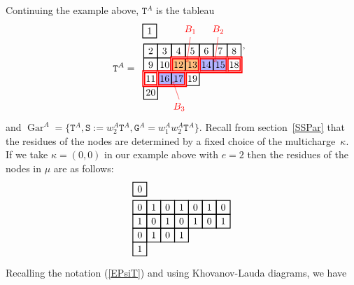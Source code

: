 \documentclass[twoside,11pt,reqno]{amsart}
\numberwithin{equation}{section}
\theoremstyle{definition}  %
\newcommand{\Stab}{\operatorname{Stab}}
\newcommand{\0}{{\bar 0}}
\newcommand{\1}{{\bar 1}}
\def\T{{\mathtt T}}
\def\Stab{{\mathtt S}}
\def\G{{\mathtt G}}
\def\Gar{{\operatorname{Gar}}}
\newcommand\Tableau[2][\relax]{
  \begin{tikzpicture}[scale=0.5,draw/.append style={thick,black}]
    \ifx\relax#1\relax%
    \else %
      \foreach\box in {#1} { \filldraw[blue!30]\box+(-.5,-.5)rectangle++(.5,.5); }
    \fi
    \newcount\row\newcount\col
    \row=0
    \foreach \Row in {#2} {
       \col=1
       \foreach\k in \Row {
          \draw(\the\col,\the\row)+(-.5,-.5)rectangle++(.5,.5);
          \draw(\the\col,\the\row)node{\k};
          \global\advance\col by 1
       }
       \global\advance\row by -1
    }
  \end{tikzpicture}
}
\begin{document}
Continuing the example above, $\T^A$ is the tableau
$$\T^A=\begin{array}{l}
\Tableau{{1}}\\[-20pt]
\begin{tikzpicture}[scale=0.5,draw/.append style={thick,black},baseline=1mm]
  \fill[orange!50](2.5,-1.5)rectangle(4.5,-0.5);
  \fill[blue!30](4.5,-1.5)rectangle(6.5,-0.5);
  \fill[blue!30](1.5,-2.5)rectangle(3.5,-1.5);
  \newcount\col
  \foreach\Row/\row in {{2,3,4,5,6,7,8}/0,{9,10,12,13,14,15,18}/-1,{11,16,17,19}/-2,{20}/-3} {
     \col=1
     \foreach\k in \Row {
        \draw(\the\col,\row)+(-.5,-.5)rectangle++(.5,.5);
        \draw(\the\col,\row)node{\k};
        \global\advance\col by 1
      }
   }
   \draw[red,double,very thick](2.5,-1.5)--(2.5,-0.5)--(7.5,-0.5)--(7.5,-1.5)--(3.5,-1.5)
                     --(3.5,-2.5)--(0.5,-2.5)--(0.5,-1.5)--(2.5,-1.5);
   \draw[red,double,very thick](4.5,-0.5)--(4.5,-1.5);
   \draw[red,double,very thick](6.5,-0.5)--(6.5,-1.5);
   \draw[red,double,very thick](1.5,-1.5)--(1.5,-2.5);
   \draw[red,double,very thick](2.5,-1.5)--(3.5,-1.5);
   \draw[red,thin,->](3.85,1)node[red,above=0mm]{$B_1$}--(3.6,-0.8);
   \draw[red,thin,->](5.85,1)node[red,above=0mm]{$B_2$}--(5.6,-0.8);
   \draw[red,thin,->](3.05,-3.5)node[red,below=0mm]{$B_3$}--(2.6,-2.2);
\end{tikzpicture},
\end{array}$$
and 
$\Gar^A=\{\T^A,\Stab:=w_2^A\T^A,\G^A=w_1^Aw_2^A\T^A\}.$
Recall from section~\ref{SSPar} that the
residues of the nodes are determined by a fixed choice of the multicharge~$\kappa$. If we take
$\kappa=(0,0)$ in our example above with $e=2$ then the residues of the nodes in $\mu$ are as follows:
$$\begin{array}{l}
\Tableau{{0}}\\ \Tableau{{0,1,0,1,0,1,0},{1,0,1,0,1,0,1},{0,1,0,1},{1}}
\end{array}$$
Recalling the notation (\ref{EPsiT}) and using Khovanov-Lauda diagrams, we have
\end{document}
